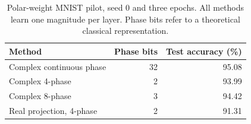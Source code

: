 \begin{table}[t]
\centering
\caption{Polar-weight MNIST pilot, seed 0 and three epochs. All methods learn one magnitude per layer. Phase bits refer to a theoretical classical representation.}
\label{tab:phase-pilot}
\begin{tabular}{lrr}
\hline
Method & Phase bits & Test accuracy (\%) \\
\hline
Complex continuous phase & 32 & 95.08 \\
Complex 4-phase & 2 & 93.99 \\
Complex 8-phase & 3 & 94.42 \\
Real projection, 4-phase & 2 & 91.31 \\
\hline
\end{tabular}
\end{table}
